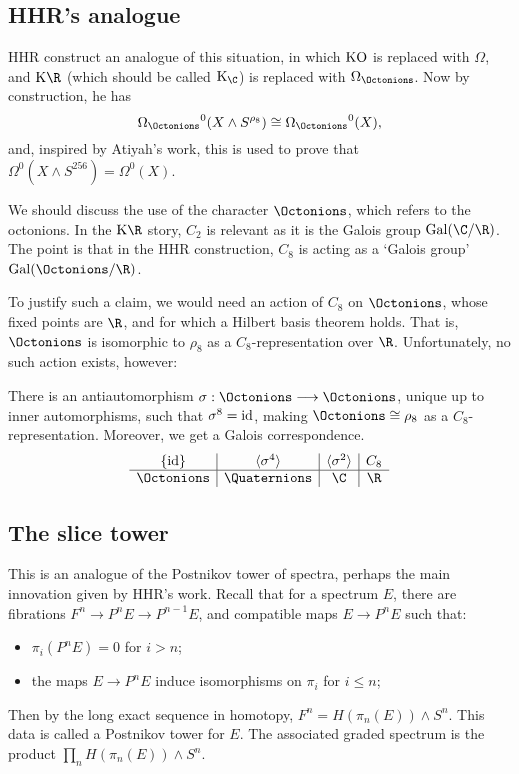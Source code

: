 \documentclass[11pt]{article}
\begin{document}
\subsection*{HHR's analogue}
HHR construct an analogue of this situation, in which $\operatorname{{KO}}$ is replaced with
$\Omega$, and $\KR$ (which should be called $\K_\C$) is replaced with $\OmegaO$.
Now by construction, he has
\[\OmegaO^0(X\wedge S^{\rho_8})\cong\OmegaO^0(X),\]
and, inspired by Atiyah's work, this is used to prove that $\Omega^0(X\wedge
S^{256})=\Omega^0(X)$.

We should discuss the use of the character $\Octonions$, which refers to the
octonions. In the $\KR$ story, $C_2$ is relevant as it is the Galois group
$\Gal(\C/\R)$. The point is that in the HHR construction, $C_8$ is acting as a
`Galois group' $\Gal(\Octonions/\R)$.

To justify such a claim, we would need an action of $C_8$ on $\Octonions$, whose
fixed points are $\R$, and for which a Hilbert basis theorem holds. That is,
$\Octonions$ is isomorphic to $\rho_8$ as a $C_8$-representation over $\R$.
Unfortunately, no such action exists, however:
\begin{fact*}
There is an antiautomorphism $\sigma:\Octonions\to \Octonions$, unique up to
inner automorphisms, such that $\sigma^8=\textup{id}$, making $\Octonions\cong\rho_8$ as
a $C_8$-representation. Moreover, we get a Galois correspondence.
\[\begin{array}{c|c|c|c}
\{\id\}&\langle\sigma^4\rangle&\langle\sigma^2\rangle&C_8\\\hline
\Octonions&\Quaternions&\C&\R
\end{array}\]
\end{fact*}
\subsection*{The slice tower}
This is an analogue of the Postnikov tower of spectra, perhaps the main
innovation given by HHR's work. Recall that for a spectrum $E$, there are
fibrations $F^n\to P^nE\to P^{n-1}E$, and compatible maps $E\to P^nE$ such that:
\begin{itemize}\squishlist
\item $\pi_{i}(P^n E)=0$ for $i>n$;
\item the maps $E\to P^nE$ induce isomorphisms on $\pi_{i}$ for $i\leq n$;
\end{itemize}
Then by the long exact sequence in homotopy, $F^n=H(\pi_n(E))\wedge S^n$. This
data is called a Postnikov tower for $E$.
The associated graded spectrum is the product $\prod_nH(\pi_n(E))\wedge S^n$.
\end{document}
